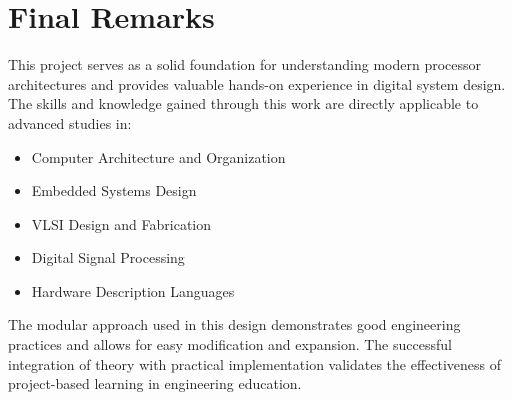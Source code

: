 \section{Final Remarks}

This project serves as a solid foundation for understanding modern processor architectures and provides valuable hands-on experience in digital system design. The skills and knowledge gained through this work are directly applicable to advanced studies in:
\begin{itemize}
    \item Computer Architecture and Organization
    \item Embedded Systems Design
    \item VLSI Design and Fabrication
    \item Digital Signal Processing
    \item Hardware Description Languages
\end{itemize}

The modular approach used in this design demonstrates good engineering practices and allows for easy modification and expansion. The successful integration of theory with practical implementation validates the effectiveness of project-based learning in engineering education.
